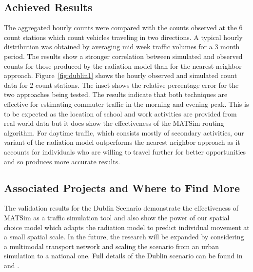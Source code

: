 \subsection{Achieved Results}
The aggregated hourly counts were compared with the counts observed at the 6 count stations which count vehicles traveling in two directions.  A typical hourly distribution was obtained by averaging mid week traffic volumes for a 3 month period.  The results show a stronger correlation between simulated and observed counts for those produced by the radiation model than for the nearest neighbor approach.  Figure~\ref{fig:dublin1} shows the hourly observed and simulated count data for 2 count stations.  The inset shows the relative percentage error for the two approaches being tested. The results indicate that both techniques are effective for estimating commuter traffic in the morning and evening peak. This is to be expected as the location of school and work activities are provided from real world data but it does show the effectiveness of the MATSim routing algorithm. For daytime traffic, which consists mostly of secondary activities, our variant of the radiation model outperforms the nearest neighbor approach as it accounts for individuals who are willing to travel further for better opportunities and so produces more accurate results.

\subsection{Associated Projects and Where to Find More}
The validation results for the Dublin Scenario demonstrate the effectiveness of MATSim as a traffic simulation tool and also show the power of our spatial choice model which adapts the radiation model to predict individual movement at a small spatial scale. In the future, the research will be expanded by considering a multimodal transport network and scaling the scenario from an urban simulation to a national one. Full details of the Dublin scenario can be found in \citet[][]{McArdleEtAl_IWUC_2012} and \citet[][]{McArdleEtAl_ACMTIS_2014}.

